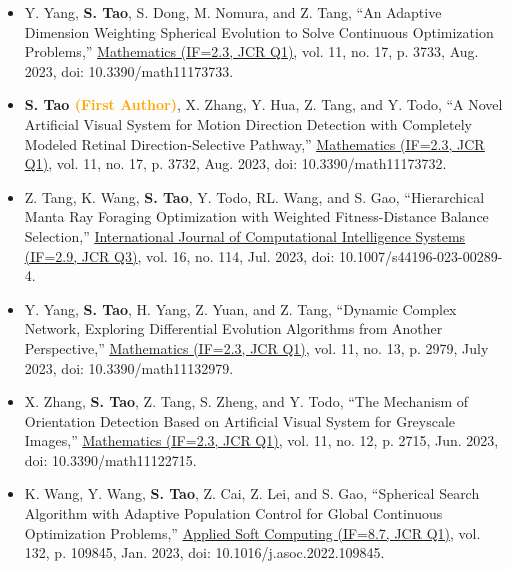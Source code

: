 \documentclass[11pt,a4paper,sans]{moderncv}
\renewcommand{\underline}[1]{\uline{#1}}
\begin{document}
{\begin{itemize}[label=\textbullet]
      \item [13)] Y. Yang, \textbf{S. Tao}, S. Dong, M. Nomura, and Z. Tang, “An Adaptive Dimension Weighting Spherical Evolution to Solve Continuous Optimization Problems,” \color{black}\href{https://www.mdpi.com/journal/mathematics}{\underline{Mathematics (IF=2.3, JCR Q1)}}, vol. 11, no. 17, p. 3733, Aug. 2023, doi: 10.3390/math11173733. 
      
      \item [12)] \textbf{S. Tao \textcolor{orange}{(First Author)}}, X. Zhang, Y. Hua, Z. Tang, and Y. Todo, “A Novel Artificial Visual System for Motion Direction Detection with Completely Modeled Retinal Direction-Selective Pathway,” \color{black}\href{https://www.mdpi.com/journal/mathematics}{\underline{Mathematics (IF=2.3, JCR Q1)}}, vol. 11, no. 17, p. 3732, Aug. 2023, doi: 10.3390/math11173732.
      
      \item [11)] Z. Tang, K. Wang, \textbf{S. Tao}, Y. Todo, RL. Wang, and S. Gao, “Hierarchical Manta Ray Foraging Optimization with Weighted Fitness-Distance Balance Selection,” \color{black}\href{https://link.springer.com/journal/44196}{\underline{International Journal of Computational Intelligence Systems (IF=2.9, JCR Q3)}}, vol. 16, no. 114, Jul. 2023, doi: 10.1007/s44196-023-00289-4.

      \item [10)] Y. Yang, \textbf{S. Tao}, H. Yang, Z. Yuan, and Z. Tang, “Dynamic Complex Network, Exploring Differential Evolution Algorithms from Another Perspective,” \color{black}\href{https://www.mdpi.com/journal/mathematics}{\underline{Mathematics (IF=2.3, JCR Q1)}}, vol. 11, no. 13, p. 2979, July 2023, doi: 10.3390/math11132979.
      
      \item [9)] X. Zhang, \textbf{S. Tao}, Z. Tang, S. Zheng, and Y. Todo, “The Mechanism of Orientation Detection Based on Artificial Visual System for Greyscale Images,” \color{black}\href{https://www.mdpi.com/journal/mathematics}{\underline{Mathematics (IF=2.3, JCR Q1)}}, vol. 11, no. 12, p. 2715, Jun. 2023, doi: 10.3390/math11122715.
      
      \item [8)] K. Wang, Y. Wang, \textbf{S. Tao}, Z. Cai, Z. Lei, and S. Gao, “Spherical Search Algorithm with Adaptive Population Control for Global Continuous Optimization Problems,” \color{black}\href{https://www.sciencedirect.com/journal/applied-soft-computing}{\underline{Applied Soft Computing (IF=8.7, JCR Q1)}}, vol. 132, p. 109845, Jan. 2023, doi: 10.1016/j.asoc.2022.109845.
      

\end{itemize}}
\end{document}
